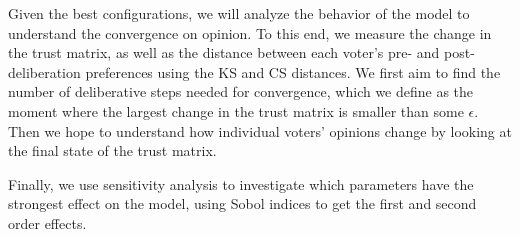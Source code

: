 Given the best configurations, we will analyze the behavior of the model to
understand the convergence on opinion. To this end, we measure the change in the trust
matrix, as well as the distance between each voter's pre- and post-deliberation
preferences using the KS and CS distances. We first aim to find the number of
deliberative steps needed for convergence, which we define as the moment where
the largest change in the trust matrix is smaller than some $\epsilon$. Then we
hope to understand how individual voters' opinions change by looking at the
final state of the trust matrix.

Finally, we use sensitivity analysis to investigate which parameters have the
strongest effect on the model, using Sobol indices to get the first and second
order effects.

